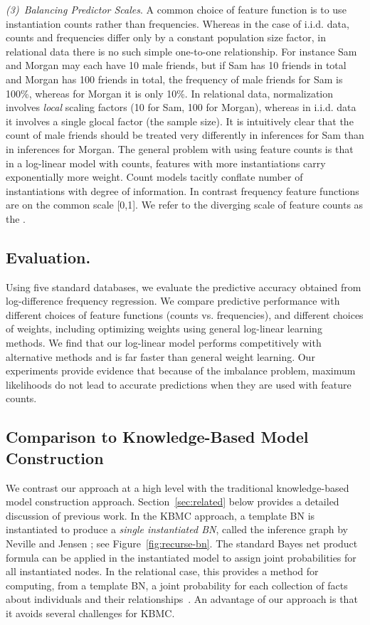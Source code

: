\documentclass[twoside,11pt]{article}
\newcommand{\point}[1]{\noindent\emph{#1}.}
\newcommand{\iid}{i.i.d.}
\begin{document}
\point{(3)~Balancing Predictor Scales} A common choice of feature function is to use instantiation counts rather than frequencies. 
Whereas in the case of \iid{} data, counts and frequencies differ only by a constant population size factor, in relational data there is no such simple one-to-one relationship. For instance Sam and Morgan may each have 10 male friends, but if Sam has 10 friends in total and Morgan has 100 friends in total, the frequency of male friends for Sam is 100\%, whereas for Morgan it is only 10\%. In relational data, normalization involves {\em local} scaling factors (10 for Sam, 100 for Morgan), whereas in i.i.d. data it involves a single glocal factor (the sample size). It is intuitively clear that the count of male friends should be treated very differently in inferences for Sam than in inferences for Morgan. The general problem with using feature counts is that in a log-linear model with counts, features with more instantiations carry exponentially more weight. Count models tacitly conflate number of instantiations with degree of information.
In contrast frequency feature functions are on the common scale [0,1].
%
We refer to the diverging scale of feature counts as the . 

\subsection{Evaluation.} Using five standard databases, we evaluate the predictive accuracy obtained from log-difference frequency regression. We compare predictive performance with different choices of feature functions (counts vs. frequencies), and different choices of weights, including optimizing weights using general log-linear learning methods. We find that our log-linear model performs competitively with %
alternative methods and is far faster than general weight learning. Our experiments provide evidence that because of the imbalance problem, maximum likelihoods do not lead to accurate predictions when they are used with feature counts.

\subsection{Comparison to Knowledge-Based Model Construction} \label{sec:kbmc} We contrast our approach at a high level with the traditional knowledge-based model construction approach. Section~\ref{sec:related} below provides a detailed discussion of previous work. In the KBMC approach, a template BN is instantiated to produce a {\em single instantiated BN}, called the inference graph by Neville and Jensen \cite{Neville2007}; see Figure~\ref{fig:recurse-bn}. The standard Bayes net product formula can be applied in the instantiated model to assign joint probabilities for all instantiated nodes. In the relational case, this provides a method for computing, from a template BN, a joint probability for each collection of facts about individuals and their relationships~\cite{Getoor2007c,Kersting2007}. An advantage of our approach is that it avoids several challenges for KBMC. 
\end{document}
